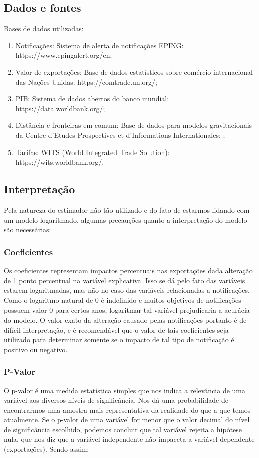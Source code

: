 \documentclass[12pt, a4paper]{article}
\begin{document}
\subsection{Dados e fontes}

Bases de dados utilizadas:

\begin{enumerate}
    \item Notificações: Sistema de alerta de notificações EPING: https://www.epingalert.org/en;
    \item Valor de exportações: Base de dados estatísticos sobre comércio internacional das Nações Unidas: https://comtrade.un.org/;
    \item PIB: Sistema de dados abertos do banco mundial: https://data.worldbank.org/;
    \item Distância e fronteiras em comum: Base de dados para modelos gravitacionais da Centre d'Etudes Prospectives et d'Informations Internationales: \cite{CEPII};
    \item Tarifas: WITS (World Integrated Trade Solution): https://wits.worldbank.org/.
\end{enumerate}

\subsection{Interpretação}

Pela natureza do estimador não tão utilizado e do fato de estarmos lidando com um modelo logaritmado, algumas precauções quanto a interpretação do modelo são necessárias:

\subsubsection{Coeficientes}

Os coeficientes representam impactos percentuais nas exportações dada alteração de 1 ponto percentual  na variável explicativa. Isso se dá pelo fato das variáveis estarem logaritmadas, mas não no caso das variáveis relacionadas a notificações. Como o logaritmo natural de 0 é indefinido e muitos objetivos de notificações possuem valor 0 para certos anos, logaritmar tal variável prejudicaria a acurácia do modelo. O valor exato da alteração causado pelas notificações portanto é de difícil interpretação, e é recomendável que o valor de tais coeficientes seja utilizado para determinar somente se o impacto de tal tipo de notificação é positivo ou negativo.

\subsubsection{P-Valor}
O p-valor é uma medida estatística simples que nos indica a relevância de uma variável aos diversos níveis de significância. Nos dá uma probabilidade de encontrarmos uma amostra mais representativa da realidade do que a que temos atualmente. Se o p-valor de uma variável for menor que o valor decimal do nível de significância escolhido, podemos concluir que tal variável rejeita a hipótese nula, que nos diz que a variável independente não impaccta a variável dependente (exportações). Sendo assim:
\end{document}
